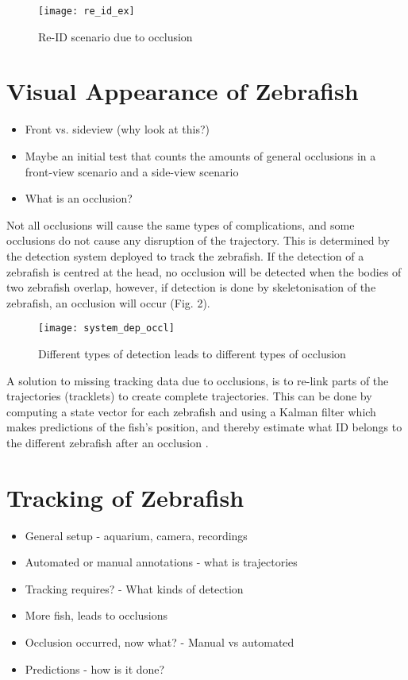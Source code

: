 \begin{figure}[H]
	\centering
	\texttt{[image: re\_id\_ex]}
	\caption{Re-ID scenario due to occlusion}
	\label{fig:re-id_Ex}
\end{figure}

\section{Visual Appearance of Zebrafish}

\begin{itemize}
	\item Front vs. sideview (why look at this?)
	\item Maybe an initial test that counts the amounts of general occlusions in a front-view scenario and a side-view scenario
	\item What is an occlusion?
\end{itemize}


Not all occlusions will cause the same types of complications, and some occlusions do not cause any disruption of the trajectory. This is determined by the detection system deployed to track the zebrafish. If the detection of a zebrafish is centred at the head, no occlusion will be detected when the bodies of two zebrafish overlap, however, if detection is done by skeletonisation of the zebrafish, an occlusion will occur (Fig. 2).\\

\begin{figure}[H]
	\centering
	\texttt{[image: system\_dep\_occl]}
	\caption{Different types of detection leads to different types of occlusion}
	\label{fig:system_dep_occl}
\end{figure}

A solution to missing tracking data due to occlusions, is to re-link parts of the trajectories (tracklets) to create complete trajectories. This can be done by computing a state vector for each zebrafish and using a Kalman filter which makes predictions of the fish’s position, and thereby estimate what ID belongs to the different zebrafish after an occlusion \citep{Feijo2018, Qian2014}.

\section{Tracking of Zebrafish}

\begin{itemize}
	\item General setup - aquarium, camera, recordings
	\item Automated or manual annotations - what is trajectories
	\item Tracking requires? - What kinds of detection
	\item More fish, leads to occlusions
	\item Occlusion occurred, now what? - Manual vs automated
	\item Predictions - how is it done?	
\end{itemize}

